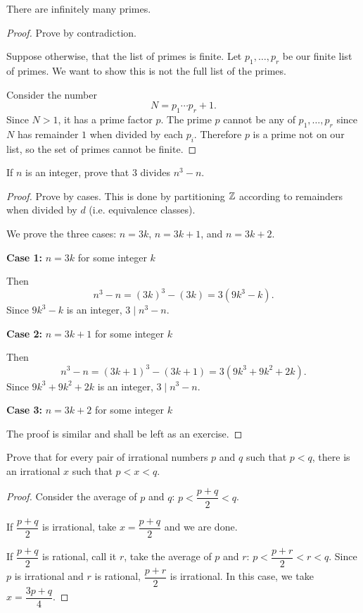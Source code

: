 \begin{prbm}
There are infinitely many primes.
\end{prbm}

\begin{proof}
Prove by contradiction.

Suppose otherwise, that the list of primes is finite. Let $p_1,\dots,p_r$ be our finite list of primes. We want to show this is not the full list of the primes.

Consider the number
\[ N=p_1\cdots p_r+1. \]
Since $N>1$, it has a prime factor $p$. The prime $p$ cannot be any of $p_1,\dots,p_r$ since $N$ has remainder $1$ when divided by each $p_i$. Therefore $p$ is a prime not on our list, so the set of primes cannot be finite.
\end{proof}

\begin{prbm}
If $n$ is an integer, prove that $3$ divides $n^3-n$.
\end{prbm}

\begin{proof}
Prove by cases. This is done by partitioning $\mathbb Z$ according to remainders when divided by $d$ (i.e. equivalence classes).

We prove the three cases: $n=3k$, $n=3k+1$, and $n=3k+2$.

\textbf{Case 1:} $n=3k$ for some integer $k$

Then
\[ n^3-n=(3k)^3-(3k)=3(9k^3-k). \]
Since $9k^3-k$ is an integer, $3\mid n^3-n$.

\textbf{Case 2:} $n=3k+1$ for some integer $k$

Then
\[ n^3-n=(3k+1)^3-(3k+1)=3(9k^3+9k^2+2k). \]
Since $9k^3+9k^2+2k$ is an integer, $3\mid n^3-n$.

\textbf{Case 3:} $n=3k+2$ for some integer $k$

The proof is similar and shall be left as an exercise.
\end{proof}
\pagebreak

\begin{prbm}
Prove that for every pair of irrational numbers $p$ and $q$ such that $p<q$, there is an irrational $x$ such that $p<x<q$.
\end{prbm}

\begin{proof}
Consider the average of $p$ and $q$: $p<\dfrac{p+q}{2}<q$.

If $\dfrac{p+q}{2}$ is irrational, take $x=\dfrac{p+q}{2}$ and we are done.

If $\dfrac{p+q}{2}$ is rational, call it $r$, take the average of $p$ and $r$: $p<\dfrac{p+r}{2}<r<q$. Since $p$ is irrational and $r$ is rational, $\dfrac{p+r}{2}$ is irrational. In this case, we take $x=\dfrac{3p+q}{4}$.
\end{proof}

